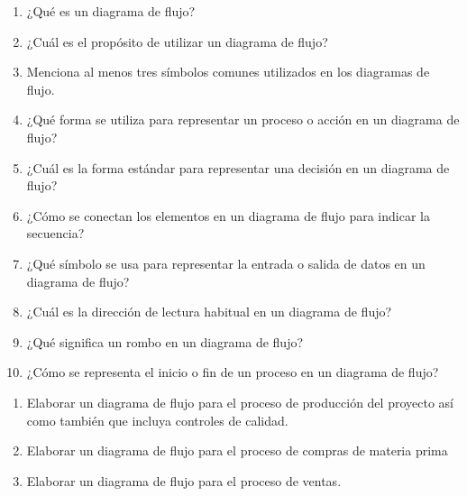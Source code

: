 \documentclass[../main]{subfiles}
\begin{document}
\begin{enumerate}
  \item ¿Qué es un diagrama de flujo?

  \item ¿Cuál es el propósito de utilizar un diagrama de flujo?

  \item Menciona al menos tres símbolos comunes utilizados en los
    diagramas de flujo.

  \item ¿Qué forma se utiliza para representar un proceso o acción en
    un diagrama de flujo?

  \item ¿Cuál es la forma estándar para representar una decisión en
    un diagrama de flujo?

  \item ¿Cómo se conectan los elementos en un diagrama de flujo para
    indicar la secuencia?

  \item ¿Qué símbolo se usa para representar la entrada o salida de
    datos en un diagrama de flujo?

  \item ¿Cuál es la dirección de lectura habitual en un diagrama de flujo?

  \item ¿Qué significa un rombo en un diagrama de flujo?

  \item ¿Cómo se representa el inicio o fin de un proceso en un
    diagrama de flujo?
\end{enumerate}
\begin{enumerate}
  \item Elaborar un diagrama de flujo para el proceso de producción
    del proyecto así como también que incluya controles de calidad.
  \item Elaborar un diagrama de flujo para el proceso de compras de
    materia prima
  \item Elaborar un diagrama de flujo para el proceso de ventas.
\end{enumerate}
\end{document}

